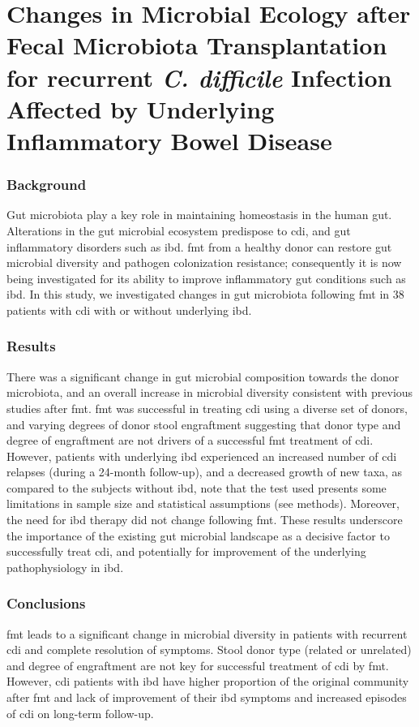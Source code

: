 \section{Changes in Microbial Ecology after Fecal Microbiota Transplantation for recurrent \textit{C. difficile} Infection Affected by Underlying Inflammatory Bowel Disease}\label{section_fmt}

\subsubsection{Background}
Gut microbiota play a key role in maintaining homeostasis in the human gut. Alterations in the gut microbial ecosystem predispose to \gls{cdi}, and gut inflammatory disorders such as \gls{ibd}. \Gls{fmt} from a healthy donor can restore gut microbial diversity and pathogen colonization resistance; consequently it is now being investigated for its ability to improve inflammatory gut conditions such as \gls{ibd}.  In this study, we investigated changes in gut microbiota following \gls{fmt} in 38 patients with \gls{cdi} with or without underlying \gls{ibd}. 

\subsubsection{Results}
There was a significant change in gut microbial composition towards the donor microbiota, and an overall increase in microbial diversity consistent with previous studies after \gls{fmt}. \gls{fmt} was successful in treating \gls{cdi} using a diverse set of donors, and varying degrees of donor stool engraftment suggesting that donor type and degree of engraftment are not drivers of a successful \gls{fmt} treatment of \gls{cdi}. However, patients with underlying \gls{ibd} experienced an increased number of \gls{cdi} relapses (during a 24-month follow-up), and a decreased growth of new taxa, as compared to the subjects without \gls{ibd}, note that the test used presents some limitations in sample size and statistical assumptions (see methods). Moreover, the need for \gls{ibd} therapy did not change following \gls{fmt}. These results underscore the importance of the existing gut microbial landscape as a decisive factor to successfully treat \gls{cdi}, and potentially for improvement of the underlying pathophysiology in \gls{ibd}. 

\subsubsection{Conclusions}
\Gls{fmt} leads to a significant change in microbial diversity in patients with recurrent \gls{cdi} and complete resolution of symptoms. Stool donor type (related or unrelated) and degree of engraftment are not key for successful treatment of \gls{cdi} by \gls{fmt}. However, \gls{cdi} patients with \gls{ibd} have higher proportion of the original community after \gls{fmt} and lack of improvement of their \gls{ibd} symptoms and increased episodes of \gls{cdi} on long-term follow-up.


